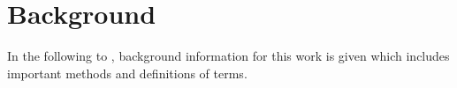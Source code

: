 \chapter{Background}
\label{ch:background}
%
In the following  to , background information for this work is given which includes important methods and definitions of terms.
%

%

%

%

%

%
\clearpage
